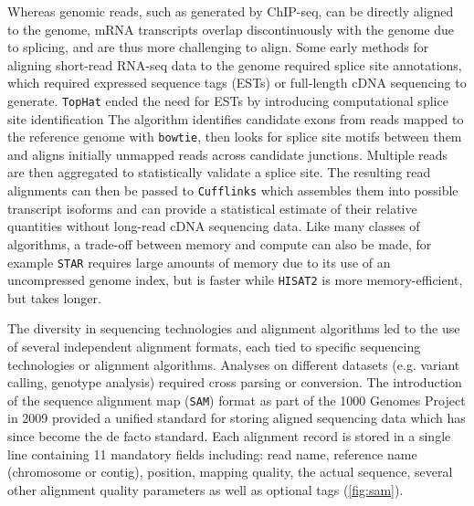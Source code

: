 Whereas genomic reads, such as generated by ChIP-seq, can be directly aligned to the genome, mRNA transcripts overlap discontinuously with the genome due to splicing, and are thus more challenging to align. Some early methods for aligning short-read RNA-seq data to the genome required splice site annotations, which required expressed sequence tags (ESTs) or full-length cDNA sequencing to generate. \verb|TopHat| ended the need for ESTs by introducing computational splice site identification The algorithm identifies candidate exons from reads mapped to the reference genome with \verb|bowtie|, then looks for splice site motifs between them and aligns initially unmapped reads across candidate junctions. Multiple reads are then aggregated to statistically validate a splice site. The resulting read alignments can then be passed to \verb|Cufflinks| which assembles them into possible transcript isoforms and can provide a statistical estimate of their relative quantities without long-read cDNA sequencing data. Like many classes of algorithms, a trade-off between memory and compute can also be made, for example \verb|STAR| requires large amounts of memory due to its use of an uncompressed genome index, but is faster while \verb|HISAT2| is more memory-efficient, but takes longer.




The diversity in sequencing technologies and alignment algorithms led to the use of several independent alignment formats, each tied to specific sequencing technologies or alignment algorithms. Analyses on different datasets (e.g. variant calling, genotype analysis) required cross parsing or conversion. The introduction of the sequence alignment map (\verb|SAM|) format as part of the 1000 Genomes Project in 2009 provided a unified standard for storing aligned sequencing data which has since become the de facto standard. Each alignment record is stored in a single line containing 11 mandatory fields including: read name, reference name (chromosome or contig), position, mapping quality, the actual sequence, several other alignment quality parameters as well as optional tags (\autoref{fig:sam}).


